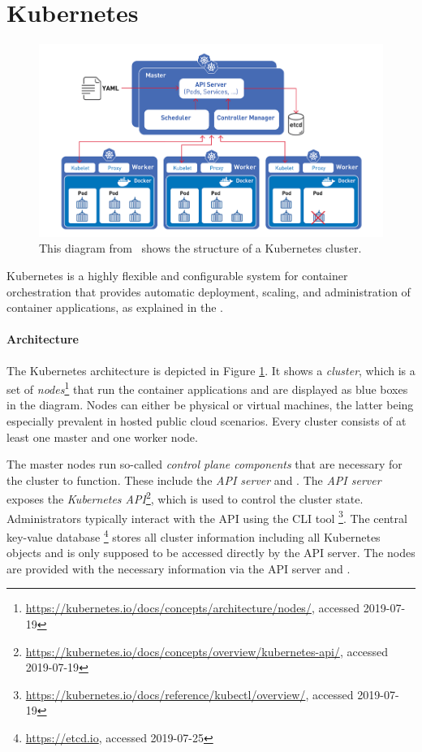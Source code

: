 \section{Kubernetes} \label{sec:bkgK8s}

\begin{figure}[H]
\begin{center}
    \includegraphics[width=0.8\linewidth]{figures/k8s_architecture.png}
    \caption[Kubernetes Architecture]{This diagram from~\textcite{k8sDiagram} shows the structure of a Kubernetes cluster.}
    \label{fig:k8sArchitecture}
\end{center}
\end{figure}


Kubernetes is a highly flexible and configurable system for container orchestration that provides automatic deployment, scaling, and administration of container applications, as explained in the \textcite{k8sdocs}. 

\paragraph{Architecture}

The Kubernetes architecture is depicted in Figure \ref{fig:k8sArchitecture}. It shows a \textit{cluster}, which is a set of \textit{nodes}\footnote{\url{https://kubernetes.io/docs/concepts/architecture/nodes/}, accessed 2019-07-19} that run the container applications and are displayed as blue boxes in the diagram. Nodes can either be physical or virtual machines, the latter being especially prevalent in hosted public cloud scenarios. Every cluster consists of at least one master and one worker node. 

The master nodes run so-called \textit{control plane components} that are necessary for the cluster to function. These include the \textit{API server} and . The \textit{API server} exposes the \textit{Kubernetes API}\footnote{\url{https://kubernetes.io/docs/concepts/overview/kubernetes-api/}, accessed 2019-07-19}, which is used to control the cluster state. Administrators typically interact with the API using the CLI tool \footnote{\url{https://kubernetes.io/docs/reference/kubectl/overview/}, accessed 2019-07-19}. The central key-value database \footnote{\url{https://etcd.io}, accessed 2019-07-25} stores all cluster information including all Kubernetes objects and is only supposed to be accessed directly by the API server. The nodes are provided with the necessary information via the API server and .

